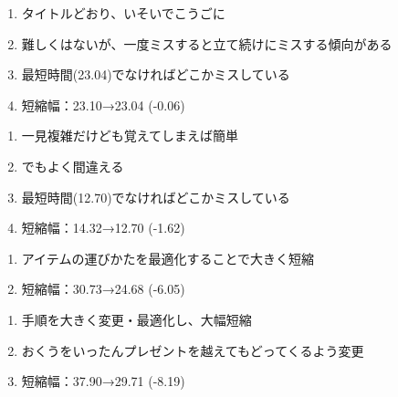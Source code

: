 \begin{enumerate}[label={\sarrow}]
\item タイトルどおり、いそいでこうごに
\item 難しくはないが、一度ミスすると立て続けにミスする傾向がある
\item 最短時間(23.04)でなければどこかミスしている
\item 短縮幅：23.10→23.04 (-0.06)
\end{enumerate}



\begin{enumerate}[label={\sarrow}]
\item 一見複雑だけども覚えてしまえば簡単
\item でもよく間違える
\item 最短時間(12.70)でなければどこかミスしている
\item 短縮幅：14.32→12.70 (-1.62)
\end{enumerate}



\begin{enumerate}[label={\sarrow}]
\item アイテムの運びかたを最適化することで大きく短縮
\item 短縮幅：30.73→24.68 (-6.05)
\end{enumerate}



\begin{enumerate}[label={\sarrow}]
\item 手順を大きく変更・最適化し、大幅短縮
\item おくうをいったんプレゼントを越えてもどってくるよう変更
\item 短縮幅：37.90→29.71 (-8.19)
\end{enumerate}



